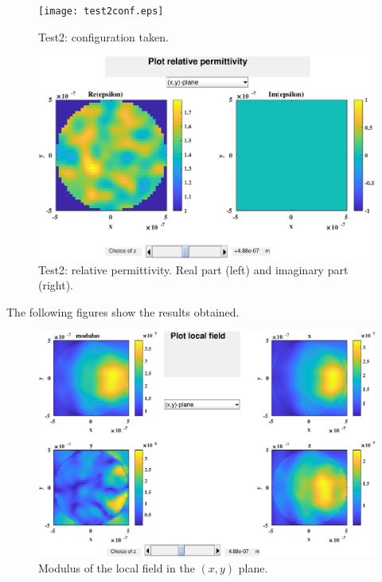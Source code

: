 \begin{figure}[H]
\begin{center}
  \texttt{[image: test2conf.eps]}
\end{center}
\caption{Test2: configuration taken.}
\label{test2conf}
\end{figure}
\begin{figure}[H]
\begin{center}
  \includegraphics*[width=15.0cm,draft=false]{test2epsilon.eps}
\end{center}
\caption{Test2: relative permittivity. Real part (left) and imaginary
  part (right).}
\end{figure}
The following figures show the results obtained.
\begin{figure}[H]
\begin{center}
  \includegraphics*[width=15.0cm,draft=false]{test2local.eps}
\end{center}
\caption{Modulus of the local field in the $(x,y)$ plane.}
\end{figure}

